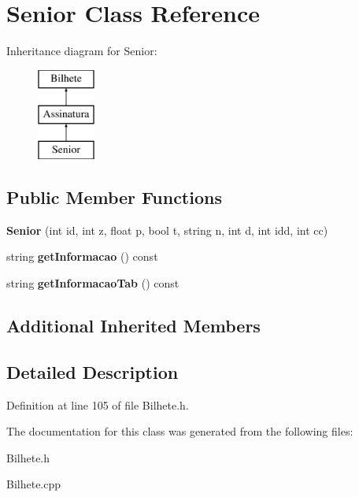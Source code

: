 \hypertarget{classSenior}{}\section{Senior Class Reference}
\label{classSenior}
Inheritance diagram for Senior\+:\begin{figure}[H]
\begin{center}
\leavevmode
\includegraphics[height=3.000000cm]{classSenior}
\end{center}
\end{figure}
\subsection*{Public Member Functions}
\begin{DoxyCompactItemize}
\item 
\mbox{\label{classSenior_ad8cf0c08d3b131aa27ceb171ecaaa01e}} 
{\bfseries Senior} (int id, int z, float p, bool t, string n, int d, int idd, int cc)
\item 
\mbox{\label{classSenior_af3c3cd2f4e495318494d16e59fb52a01}} 
string {\bfseries get\+Informacao} () const
\item 
\mbox{\label{classSenior_aae1fbe7790186fc256cb6deb40937436}} 
string {\bfseries get\+Informacao\+Tab} () const
\end{DoxyCompactItemize}
\subsection*{Additional Inherited Members}


\subsection{Detailed Description}


Definition at line 105 of file Bilhete.\+h.



The documentation for this class was generated from the following files\+:\begin{DoxyCompactItemize}
\item 
Bilhete.\+h\item 
Bilhete.\+cpp\end{DoxyCompactItemize}

